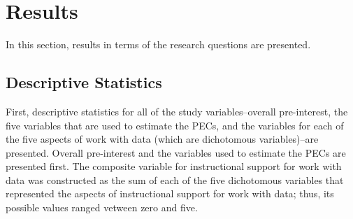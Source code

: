 \documentclass[]{msu-thesis}
\theoremstyle{definition}
\theoremstyle{definition}
\theoremstyle{definition}
\theoremstyle{remark}
\begin{document}
\chapter{Results}\label{results}

In this section, results in terms of the research questions are
presented.

\section{Descriptive Statistics}\label{descriptive-statistics}

First, descriptive statistics for all of the study variables--overall
pre-interest, the five variables that are used to estimate the PECs, and
the variables for each of the five aspects of work with data (which are
dichotomous variables)--are presented. Overall pre-interest and the
variables used to estimate the PECs are presented first. The composite
variable for instructional support for work with data was constructed as
the sum of each of the five dichotomous variables that represented the
aspects of instructional support for work with data; thus, its possible
values ranged vetween zero and five.
\end{document}
